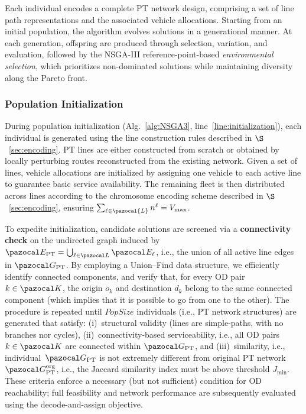 \documentclass[a4paper,fleqn]{cas-sc}
\begin{document}
Each individual encodes a complete PT network design, comprising a set of line path representations and the associated vehicle allocations.
Starting from an initial population, the algorithm evolves solutions in a generational manner.
At each generation, offspring are produced through selection, variation, and evaluation, followed by the NSGA-III reference-point-based \textit{environmental selection}, which prioritizes non-dominated solutions while maintaining diversity along the Pareto front.

\subsubsection{Population Initialization}
\label{sec:init_population}

During population initialization (Alg.~\ref{alg:NSGA3}, line~\ref{line:initialization}),
each individual is generated using the line construction rules described in $\S$~\ref{sec:encoding}.
PT lines are either constructed from scratch or obtained by locally perturbing routes reconstructed from the existing network.
Given a set of lines, vehicle allocations are initialized by assigning one vehicle to each active line to guarantee basic service availability.
The remaining fleet is then distributed across lines according to the chromosome encoding scheme described in $\S$~\ref{sec:encoding}, ensuring $\sum_{\ell \in \pazocal{L}} n^\ell = V_{\max}$.

To expedite initialization, candidate solutions are screened via a \textbf{connectivity check} on the undirected graph induced by
$\pazocal E_{\text{PT}} = \bigcup_{\ell\in\pazocal L} \pazocal E_\ell$,
i.e., the union of all active line edges in $\pazocal G_{\text{PT}}$.
By employing a Union--Find data structure, we efficiently identify connected components, and verify that, for every OD pair $k\in\pazocal K$, the origin $o_k$ and destination $d_k$
belong to the same connected component (which implies that it is possible to go from one to the other).
%
The procedure is repeated until $\textit{PopSize}$ individuals (i.e., PT network structures) are generated that satisfy:
(i)~structural validity (lines are simple-paths, with no branches nor cycles),
(ii)~connectivity-based serviceability, i.e., all OD pairs $k\in\pazocal K$ are connected within $\pazocal G_{\text{PT}}$,
and (iii)~similarity, i.e., individual~$\pazocal G_\text{PT}$ is not extremely different from original PT network~$\pazocal G_\text{PT}^\text{org}$, i.e., the Jaccard similarity index must be above threshold $J_{\min}$.
These criteria enforce a necessary (but not sufficient) condition for OD reachability; full feasibility and network performance are subsequently evaluated using the decode-and-assign objective. 
\end{document}
